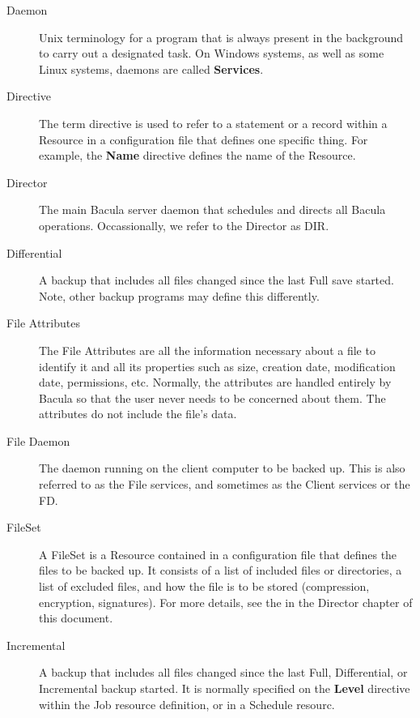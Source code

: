 \begin{description}
\item [Daemon]
   Unix terminology for a program that is always present in  the background to
carry out a designated task. On Windows systems, as  well as some Linux
systems, daemons are called {\bf Services}. 

\item [Directive]
   The term directive is used to refer to a statement  or a record within a
Resource in a configuration file that  defines one specific thing. For
example, the {\bf Name} directive  defines the name of the Resource. 

\item [Director]
   The main Bacula server daemon that schedules and directs all  Bacula
operations. Occassionally, we refer to the Director as DIR. 

\item [Differential]
   A backup that includes all files changed since the last  Full save started.
Note, other backup programs may define this differently. 

\item [File Attributes]
   The File Attributes are all the information  necessary about a file to
identify it and all its properties such as  size, creation date, modification
date, permissions, etc. Normally, the  attributes are handled entirely by
Bacula so that the user never  needs to be concerned about them. The
attributes do not include the  file's data. 

\item [File Daemon]
   The daemon running on the client  computer to be backed up. This is also
referred to as the File  services, and sometimes as the Client services or the
FD. 

\item [
   \label{FileSetDef}
   FileSet]
A FileSet is a Resource contained in a configuration  file that defines the
files to be backed up. It consists  of a list of included files or
directories, a list of excluded files, and  how the file is to be stored
(compression, encryption, signatures).  For more details, see the 
  in the
Director chapter of this document. 

\item [Incremental]
   A backup that includes all files changed since the  last Full, Differential,
or Incremental backup started. It is normally  specified on the {\bf Level}
directive within the Job resource  definition, or in a Schedule resourc. 


\end{description}
